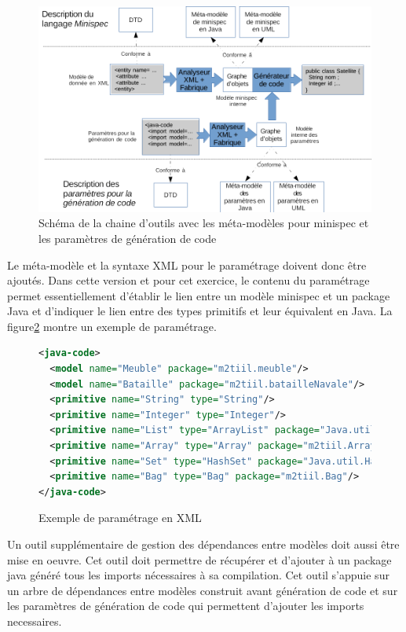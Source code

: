 \documentclass[12pt]{article}
\begin{document}
\begin{figure}
\begin{center}
\includegraphics[scale=0.5]{generation-code-4.png}
\end{center}
\caption{Schéma de la chaine d'outils avec les méta-modèles pour minispec et les paramètres de génération de code}
\label{fig:generation-code-4}
\end{figure} 

Le méta-modèle et la syntaxe XML pour le paramétrage doivent donc être ajoutés. Dans cette version et pour cet exercice, le contenu du paramétrage permet essentiellement d'établir le lien entre un modèle minispec et un package Java et d'indiquer le lien entre des types primitifs et leur équivalent en Java. La figure\ref{fig:exemple-parametrage-XML1} montre un exemple de paramétrage.  

\begin{figure}
\begin{lstlisting}[language=XML]
<java-code>
  <model name="Meuble" package="m2tiil.meuble"/>
  <model name="Bataille" package="m2tiil.batailleNavale"/>
  <primitive name="String" type="String"/>
  <primitive name="Integer" type="Integer"/>
  <primitive name="List" type="ArrayList" package="Java.util.ArrayList"/>
  <primitive name="Array" type="Array" package="m2tiil.Array"/>
  <primitive name="Set" type="HashSet" package="Java.util.HashSet"/>
  <primitive name="Bag" type="Bag" package="m2tiil.Bag"/>
</java-code>
\end{lstlisting}
\caption{Exemple de paramétrage en XML}
\label{fig:exemple-parametrage-XML1}
\end{figure} 

Un outil supplémentaire de gestion des dépendances entre modèles doit aussi être mise en oeuvre. Cet outil doit permettre de récupérer et d'ajouter à un package java généré tous les imports nécessaires à sa compilation. Cet outil s'appuie sur un arbre de dépendances entre modèles construit avant génération de code et sur les paramètres de génération de code qui permettent d'ajouter les imports necessaires.
\end{document}
